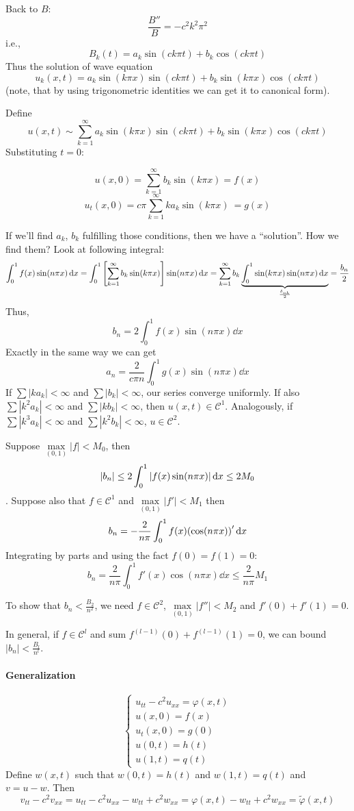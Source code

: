 Back to $B$:
$$\frac{B''}{B} = - c^2k^2\pi^2$$
i.e.,
$$B_k(t) = a_k\sin(ck\pi t)+b_k\cos(ck\pi t)$$
Thus the solution of wave equation
$$u_k(x,t) = a_k \sin(k\pi x)\sin(ck\pi t)+b_k \sin(k\pi x)\cos(ck\pi t)$$
(note, that by using trigonometric identities we can get it to canonical form).

Define 
$$u(x,t) \sim \sum_{k=1}^\infty  a_k \sin(k\pi x)\sin(ck\pi t)+b_k \sin(k\pi x)\cos(ck\pi t)$$
Substituting $t=0$:

$$u(x,0) = \sum_{k=1}^\infty b_k \sin(k\pi x) = f(x)$$
$$u_t(x,0) = c\pi \sum_{k=1}^\infty k a_k \sin(k\pi x)\ = g(x)$$

If we'll find $a_k$, $b_k$ fulfilling those conditions, then we have a ``solution''. How we find them? Look at following integral:
$$\int_0^1 f(x) \sin(n \pi x) \dd{x} = \int_0^1 \qty[\sum_{k=1}^\infty b_k \sin(k\pi x)]\sin(n \pi x) \dd{x} = \sum_{k=1}^\infty b_k\underbrace{ \int_0^1  \sin(k\pi x)\sin(n \pi x) \dd{x}}_{\frac{\delta_{nk}}{2}} = \frac{b_n}{2}$$
Thus,
$$b_n = 2\int_0^1 f(x) \sin(n \pi x) \dd{x}$$
Exactly in the same way we can get
$$a_n = \frac{2}{c\pi n} \int_0^1 g(x) \sin(n \pi x) \dd{x}$$
If $\sum |ka_k| < \infty$ and $\sum |b_k| < \infty$, our series converge uniformly. If also $\sum |k^2a_k| < \infty$ and $\sum |kb_k| < \infty$, then $u(x,t) \in \mathcal{C}^1$. Analogously, if $\sum |k^3a_k| < \infty$ and $\sum |k^2b_k| < \infty$, $u\in \mathcal{C}^2$.

Suppose $\max\limits_{(0,1)} |f|<M_0$, then 
$$|b_n| \leq 2 \int_0^1 \abs{f(x) \sin (n\pi x)}\dd{x} \leq 2M_0$$. 
Suppose also that $f\in \mathcal{C}^1$ and  $\max\limits_{(0,1)} |f'|<M_1$ then
$$b_n = -\frac{2}{n\pi} \int_0^1 f(x) \qty(\cos(n \pi x))'\dd{x}$$
Integrating by parts and using the fact $f(0)=f(1)=0$:
 $$b_n = \frac{2}{n \pi} \int_0^1 f'(x) \cos(n \pi x) \dd{x} \leq \frac{2}{n\pi}M_1$$
 
 To show that $b_n<\frac{B_2}{n^2}$, we need $f\in \mathcal{C}^2$,  $\max\limits_{(0,1)} |f''|<M_2$ and $f'(0)+f'(1)=0$. %

In general, if $f\in \mathcal{C}^l$ and sum $f^{(l-1)}(0) + f^{(l-1)}(1) = 0$, we can bound $|b_n| < \frac{B_l}{n^l}$.

\paragraph{Generalization}
$$\begin{cases}
u_{tt} - c^2 u_{xx} = \varphi(x,t)\\
u(x,0)=f(x)\\
u_t(x,0) = g(0)\\
u(0,t) = h(t)\\
u(1,t)= q(t)
\end{cases}$$
Define $w(x,t)$ such that $w(0,t) = h(t)$ and $w(1,t)=q(t)$ and $v=u-w$. Then
$$v_{tt}-c^2v_{xx} = u_{tt} - c^2 u_{xx} - w_{tt} + c^2w_{xx} = \varphi(x,t)- w_{tt} + c^2w_{xx}  = \tilde{\varphi}(x,t)$$

